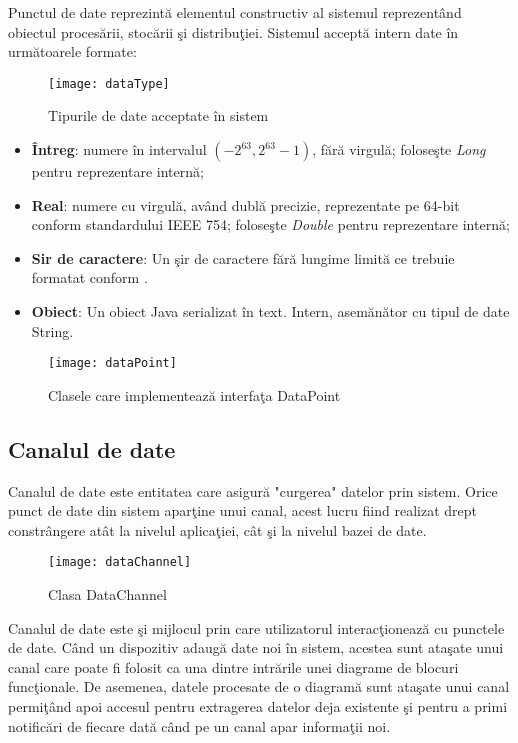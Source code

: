 Punctul de date reprezintă elementul constructiv al sistemul reprezentând obiectul procesării, stocării şi distribuţiei. 
Sistemul acceptă intern date în următoarele formate: 
\begin{wrapfigure}{r}{0.38\textwidth}
	\centering
	\texttt{[image: dataType]}
	\caption{Tipurile de date acceptate în sistem}
\end{wrapfigure}
\begin{itemize}
	\item \textbf{Întreg}: numere în intervalul $(-2^{63}, 2^{63} -1)$, fără virgulă; foloseşte \textit{Long} pentru reprezentare internă;
	\item \textbf{Real}: numere cu virgulă, având dublă precizie, reprezentate pe 64-bit conform standardului \autocite{4610935} IEEE 754;  foloseşte \textit{Double} pentru reprezentare internă;
	\item \textbf{Sir de caractere}: Un şir de caractere fără lungime limită ce trebuie formatat conform \autocite{rfc4627}. 
	\item \textbf{Obiect}: Un obiect Java serializat în text. Intern, asemănător cu tipul de date String. 
\end{itemize}

\begin{figure}[h]
	\centering
	\texttt{[image: dataPoint]}
	\caption{Clasele care implementează interfaţa DataPoint}
\end{figure}

\subsection{Canalul de date}

Canalul de date este entitatea care asigură "curgerea" datelor prin sistem. Orice punct de date din sistem aparţine unui canal, acest lucru fiind realizat drept constrângere atât la nivelul aplicaţiei, cât şi la nivelul bazei de date.
\begin{figure}[h]
	\centering
	\texttt{[image: dataChannel]}
	\caption{Clasa DataChannel}
\end{figure}

Canalul de date este şi mijlocul prin care utilizatorul interacţionează cu punctele de date. Când un dispozitiv adaugă date noi în sistem, acestea sunt ataşate unui canal  care poate fi folosit ca una dintre intrările unei diagrame de blocuri funcţionale. De asemenea, datele procesate de o diagramă sunt ataşate unui canal permiţând apoi accesul pentru extragerea datelor deja existente şi pentru a primi notificări de fiecare dată când pe un canal apar informaţii noi.

